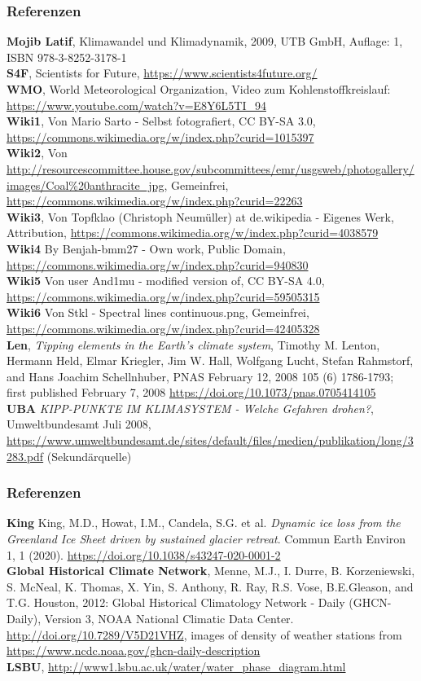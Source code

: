 \begin{frame}
	\frametitle{Referenzen}
	\small{
	\textbf{Mojib Latif}, Klimawandel und Klimadynamik, 2009, UTB GmbH, Auflage: 1, ISBN 978-3-8252-3178-1\\
	\textbf{S4F}, Scientists for Future, \url{https://www.scientists4future.org/}\\
	\textbf{WMO}, World Meteorological Organization, Video zum Kohlenstoffkreislauf: \url{https://www.youtube.com/watch?v=E8Y6L5TI\_94}\\
	\textbf{Wiki1}, Von Mario Sarto - Selbst fotografiert, CC BY-SA 3.0, \url{https://commons.wikimedia.org/w/index.php?curid=1015397}\\
	\textbf{Wiki2}, Von \url{http://resourcescommittee.house.gov/subcommittees/emr/usgsweb/photogallery/images/Coal\%20anthracite\_jpg}, Gemeinfrei, \url{https://commons.wikimedia.org/w/index.php?curid=22263}\\
	\textbf{Wiki3}, Von Topfklao (Christoph Neumüller) at de.wikipedia - Eigenes Werk, Attribution, \url{https://commons.wikimedia.org/w/index.php?curid=4038579}\\
	\textbf{Wiki4} By Benjah-bmm27 - Own work, Public Domain, \url{https://commons.wikimedia.org/w/index.php?curid=940830}\\
	\textbf{Wiki5} Von user And1mu - modified version of, CC BY-SA 4.0, \url{https://commons.wikimedia.org/w/index.php?curid=59505315}\\
	\textbf{Wiki6} Von Stkl - Spectral lines continuous.png, Gemeinfrei, \url{https://commons.wikimedia.org/w/index.php?curid=42405328}\\
	\textbf{Len}, \textit{Tipping elements in the Earth's climate system},
	Timothy M. Lenton, Hermann Held, Elmar Kriegler, Jim W. Hall, Wolfgang Lucht, Stefan Rahmstorf, and Hans Joachim Schellnhuber,
	PNAS February 12, 2008 105 (6) 1786-1793; first published February 7, 2008 \url{https://doi.org/10.1073/pnas.0705414105} \\
	\textbf{UBA} \textit{KIPP-PUNKTE IM KLIMASYSTEM - Welche Gefahren drohen?}, Umweltbundesamt Juli 2008, \url{https://www.umweltbundesamt.de/sites/default/files/medien/publikation/long/3283.pdf} (Sekundärquelle)
	}
\end{frame}

\begin{frame}
	\frametitle{Referenzen}
	\small{
	\textbf{King} King, M.D., Howat, I.M., Candela, S.G. et al. \textit{Dynamic ice loss from the Greenland Ice Sheet driven by sustained glacier retreat}. Commun Earth Environ 1, 1 (2020). \url{https://doi.org/10.1038/s43247-020-0001-2}\\
	\textbf{Global Historical Climate Network}, Menne, M.J., I. Durre, B. Korzeniewski, S. McNeal, K. Thomas, X. Yin, S. Anthony, R. Ray, R.S. Vose, B.E.Gleason, and T.G. Houston, 2012: Global Historical Climatology Network - Daily (GHCN-Daily), Version 3, NOAA National Climatic Data Center. \url{http://doi.org/10.7289/V5D21VHZ}, images of density of weather stations from \url{https://www.ncdc.noaa.gov/ghcn-daily-description}\\
	\textbf{LSBU}, \url{http://www1.lsbu.ac.uk/water/water_phase_diagram.html}
	}
\end{frame}
